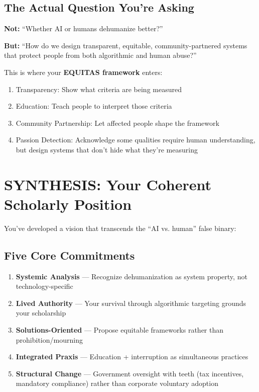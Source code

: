 \documentclass[12pt,letterpaper]{article}
\begin{document}
\subsection{The Actual Question You're Asking}

\begin{livedexperience}
\textbf{Not:} ``Whether AI or humans dehumanize better?''

\textbf{But:} ``How do we design transparent, equitable, community-partnered systems that protect people from both algorithmic and human abuse?''

This is where your \textbf{EQUITAS framework} enters:
\begin{enumerate}[leftmargin=*,noitemsep]
    \item Transparency: Show what criteria are being measured
    \item Education: Teach people to interpret those criteria
    \item Community Partnership: Let affected people shape the framework
    \item Passion Detection: Acknowledge some qualities require human understanding, but design systems that don't hide what they're measuring
\end{enumerate}
\end{livedexperience}

\newpage

\section{SYNTHESIS: Your Coherent Scholarly Position}

You've developed a vision that transcends the ``AI vs. human'' false binary:

\subsection{Five Core Commitments}

\begin{enumerate}[leftmargin=*]
    \item \textbf{Systemic Analysis} --- Recognize dehumanization as system property, not technology-specific
    \item \textbf{Lived Authority} --- Your survival through algorithmic targeting grounds your scholarship
    \item \textbf{Solutions-Oriented} --- Propose equitable frameworks rather than prohibition/mourning
    \item \textbf{Integrated Praxis} --- Education + interruption as simultaneous practices
    \item \textbf{Structural Change} --- Government oversight with teeth (tax incentives, mandatory compliance) rather than corporate voluntary adoption
\end{enumerate}
\end{document}
